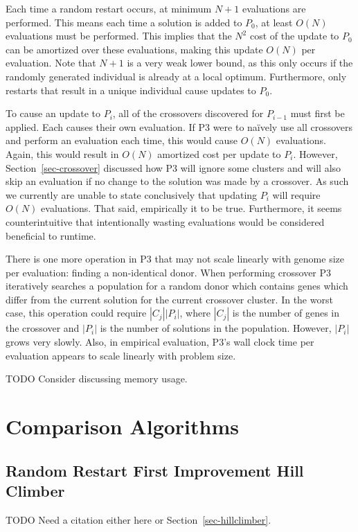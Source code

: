 \documentclass{sig-alternate}
\begin{document}
Each time a random restart occurs, at minimum $N+1$ evaluations are performed.
This means each time a solution is added to $P_0$, at least $O(N)$ evaluations
must be performed.  This implies that the $N^2$ cost of the update to $P_0$ can
be amortized over these evaluations, making this update $O(N)$ per evaluation.  Note
that $N+1$ is a very weak lower bound, as this only occurs if the randomly generated
individual is already at a local optimum.  Furthermore, only restarts that result
in a unique individual cause updates to $P_0$.

To cause an update to $P_i$, all of the crossovers discovered for
$P_{i-1}$ must first be applied.  Each causes their own evaluation.
If P3 were to na\"ively use all crossovers and perform an evaluation
each time, this would cause $O(N)$ evaluations.  Again, this would
result in $O(N)$ amortized cost per update to $P_i$.  However,
Section~\ref{sec-crossover} discussed how P3 will ignore some clusters
and will also skip an evaluation if no change to the solution was made
by a crossover.  As such we currently are unable to state conclusively
that updating $P_i$ will require $O(N)$ evaluations.  That said,
empirically it to be true.  Furthermore, it seems counterintuitive
that intentionally wasting evaluations would be considered beneficial
to runtime.

There is one more operation in P3 that may not scale linearly with
genome size per evaluation: finding a non-identical donor.  When
performing crossover P3 iteratively searches a population for a random
donor which contains genes which differ from the current solution for
the current crossover cluster.  In the worst case, this operation
could require $|C_j||P_i|$, where $|C_j|$ is the number of genes in
the crossover and $|P_i|$ is the number of solutions in the
population.  However, $|P_i|$ grows very slowly.  Also, in empirical
evaluation, P3's wall clock time per evaluation appears to scale
linearly with problem size.

TODO Consider discussing memory usage.


\section{Comparison Algorithms}

\subsection{Random Restart First Improvement Hill Climber}
TODO Need a citation either here or Section~\ref{sec-hillclimber}.
\end{document}

